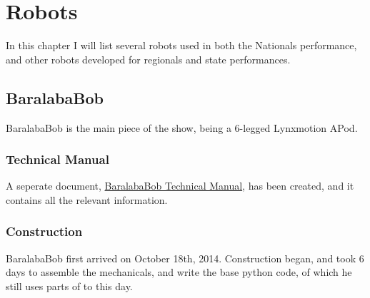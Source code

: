 \chapter{Robots}
    \label{chap:Robots}
        In this chapter I will list several robots used in both the Nationals performance, and other robots developed for regionals and state performances.
    
    	\section{BaralabaBob}
        	\label{sec:BaralabaBob}
    		BaralabaBob is the main piece of the show, being a 6-legged Lynxmotion APod.\\
    		
    		\subsection{Technical Manual}
    			A seperate document, \hyperref[part:part_six]{BaralabaBob Technical Manual}, has been created, and it contains all the relevant information.
    		
    		\subsection{Construction}
    			BaralabaBob first arrived on October 18th, 2014. Construction began, and took 6 days to assemble the mechanicals, and write the base python code, of which he still uses parts of to this day.
    			
